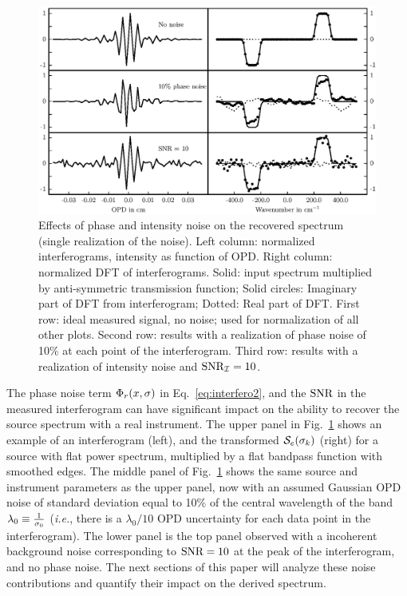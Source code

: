 \begin{figure}[!h]
\begin{center}
\includegraphics[width=\textwidth]{Figures/f3.eps}
\caption[interfero]{Effects of phase and intensity noise on the recovered spectrum (single realization of the noise). Left column: normalized interferograms, intensity as function of OPD. Right column: normalized DFT of interferograms. Solid: input spectrum multiplied by anti-symmetric transmission function; Solid circles: Imaginary part of DFT from interferogram; Dotted: Real part of DFT. First row: ideal measured signal, no noise; used for normalization of all other plots. Second row: results with a realization of phase noise of 10\% at each point of the interferogram. Third row: results with a realization of intensity noise and $\textrm{SNR}_{\mathcal{I}}=10$.}
\label{fig:interfero}
\end{center}
\end{figure}


The phase noise term $\Phi_r(x,\sigma)$ in Eq.~\ref{eq:interfero2}, and the $\textrm{SNR}$ in the measured interferogram can have significant
impact on the ability to recover the source spectrum with a real instrument. The upper panel in Fig.~\ref{fig:interfero} shows an example of an interferogram (left), and the transformed $\mathcal{S}_e(\sigma_k)$ (right) for a source with flat power spectrum, multiplied by a flat bandpass function with smoothed edges.
 The middle panel of Fig.~\ref{fig:interfero} shows
the same source and instrument parameters as the upper panel, now with an assumed Gaussian OPD noise of standard deviation equal to 10\% of the central wavelength of the band $\lambda_0\equiv {1\over\sigma_0}$ (\textit{i.e.}, there is a $\lambda_0/10$ OPD uncertainty for each data point in the interferogram). The lower panel is the top panel observed with a incoherent background noise corresponding to $\textrm{SNR}=10$ at the peak of the interferogram, and no phase noise. 
The next sections of this paper will analyze these noise contributions and quantify their impact on the derived spectrum.

